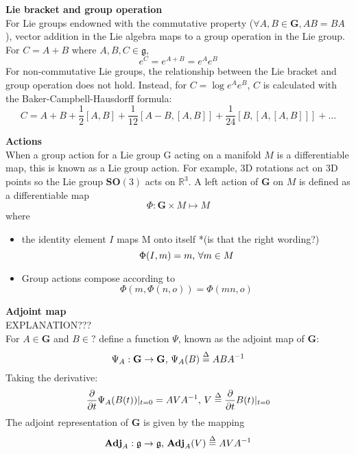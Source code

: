 		\textbf{Lie bracket and group operation}\\					
			For Lie groups endowned with the commutative property ($\forall A,B \in \mathbf{G}, AB = BA$), vector addition in the Lie algebra maps to a group operation in the Lie group. For $C = A + B$ where $A,B,C \in \mathfrak{g}$,
			\begin{equation}
				e^C = e^{A+B} = e^Ae^B
			\end{equation}
			For non-commutative Lie groups, the relationship between the Lie bracket and group operation does not hold. Instead, for $C = \log{e^Ae^B}$, $C$ is calculated with the Baker-Campbell-Hausdorff formula:
			\begin{equation}
				C = A + B + \frac{1}{2}[A,B] + \frac{1}{12}[A-B,[A,B]] + \frac{1}{24}[B,[A,[A,B]]] + \dots
			\end{equation}	
		
		\textbf{Actions}\\
			When a group action for a Lie group G acting on a manifold $M$ is a differentiable map, this is known as a Lie group action. For example, 3D rotations act on 3D points so the Lie group $\mathbf{SO}(3)$ acts on $\mathbb{R}^3$. A left action of $\mathbf{G}$ on $M$ is defined as a differentiable map
			\begin{equation}
				\Phi: \mathbf{G} \times M \mapsto M
			\end{equation}
			where
			\begin{itemize}
			\item the identity element $I$ maps M onto itself *(is that the right wording?)
				\begin{equation}
					\Phi(I,m) = m \textnormal{, } \forall m \in M
				\end{equation}
			\item Group actions compose according to
				\begin{equation}
					\Phi(m,\Phi(n,o)) = \Phi(mn,o)
				\end{equation}
			\end{itemize}
			
		\textbf{Adjoint map}\\		
		EXPLANATION???\\
		For $A \in \mathbf{G}$ and $B \in ?$ define a function $\Psi$, known as the adjoint map of $\mathbf{G}$:
		\begin{equation}
			\Psi_A: \mathbf{G} \rightarrow \mathbf{G} \textnormal{, }
			\Psi_A(B) \stackrel{\Delta}{=} ABA^{-1}
		\end{equation}
		Taking the derivative:
		\begin{equation}
			\frac{\partial}{\partial t} \Psi_A(B(t))|_{t=0} = AVA^{-1} \textnormal{, }
			V \stackrel{\Delta}{=} 	\frac{\partial}{\partial t}B(t)|_{t=0}
		\end{equation}
		The adjoint	representation of $\mathbf{G}$ is given by the mapping
		\begin{equation}
			\textbf{Adj}_A: \mathfrak{g} \rightarrow \mathfrak{g} \textnormal{, }
			\textbf{Adj}_A(V) \stackrel{\Delta}{=} AVA^{-1}
		\end{equation}
	
